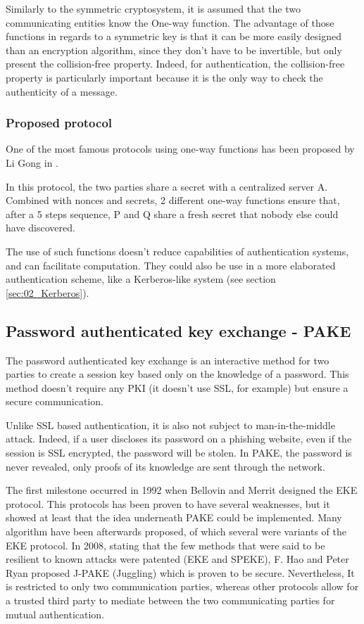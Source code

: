 Similarly to the symmetric cryptosystem, it is assumed that the two communicating entities know the One-way function. The advantage of those functions in regards to a symmetric key is that it can be more easily designed than an encryption algorithm, since they don't have to be invertible, but only present the collision-free property. Indeed, for authentication, the collision-free property is particularly important because it is the only way to check the authenticity of a message.

\subsubsection{Proposed protocol}
One of the most famous protocols using one-way functions has been proposed by Li Gong\cite{Gong1989} in .

In this protocol, the two parties share a secret with a centralized server A. Combined with nonces and secrets, 2 different one-way functions ensure that, after a 5 steps sequence, P and Q share a fresh secret that nobody else could have discovered.

The use of such functions doesn't reduce capabilities of authentication systems, and can facilitate computation. They could also be use in a more elaborated authentication scheme, like a Kerberos-like system (see section \ref{sec:02_Kerberos}).

\subsection{Password authenticated key exchange - PAKE}
The password authenticated key exchange is an interactive method for two parties to create a session key based only on the knowledge of a password. This method doesn't require any PKI (it doesn't use SSL, for example) but ensure a secure communication.

Unlike SSL based authentication, it is also not subject to man-in-the-middle attack. Indeed, if a user discloses its password on a phishing website, even if the session is SSL encrypted, the password will be stolen. In PAKE, the password is never revealed, only proofs of its knowledge are sent through the network.

The first milestone occurred in 1992 when Bellovin and Merrit designed the EKE protocol\cite{Bellovin1992}. This protocols has been proven to have several weaknesses, but it showed at least that the idea underneath PAKE could be implemented. Many algorithm have been afterwards proposed, of which several were variants of the EKE protocol. In 2008, stating that the few methods that were said to be resilient to known attacks were patented (EKE\cite{bellovin1993cryptographic} and SPEKE\cite{jablon2001cryptographic}), F. Hao and Peter Ryan proposed J-PAKE (Juggling) which is proven to be secure\cite{hao2010j}\cite{Hao2011}. Nevertheless, It is restricted to only two communication parties, whereas other protocols allow for a trusted third party to mediate between the two communicating parties for mutual authentication\cite{gong1993protecting}\cite{gong1995optimal}.

